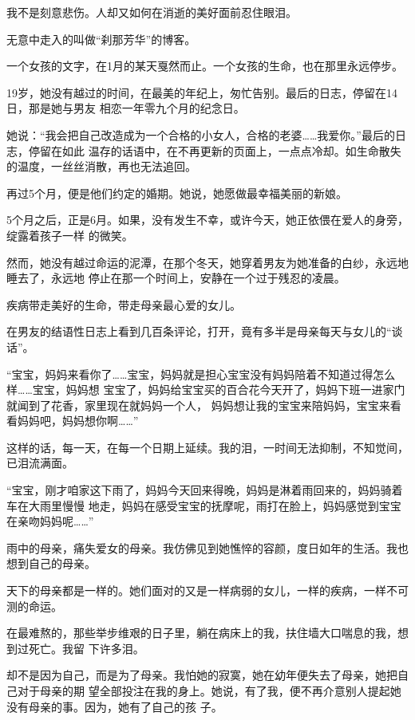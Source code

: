 	\endwriting



		我不是刻意悲伤。人却又如何在消逝的美好面前忍住眼泪。

		无意中走入的叫做“刹那芳华”的博客。

		一个女孩的文字，在1月的某天戛然而止。一个女孩的生命，也在那里永远停步。

		19岁，她没有越过的时间，在最美的年纪上，匆忙告别。最后的日志，停留在14日，那是她与男友
	相恋一年零九个月的纪念日。

		她说：“我会把自己改造成为一个合格的小女人，合格的老婆……我爱你。”最后的日志，停留在如此
	温存的话语中，在不再更新的页面上，一点点冷却。如生命散失的温度，一丝丝消散，再也无法追回。

		再过5个月，便是他们约定的婚期。她说，她愿做最幸福美丽的新娘。

		5个月之后，正是6月。如果，没有发生不幸，或许今天，她正依偎在爱人的身旁，绽露着孩子一样
	的微笑。

		然而，她没有越过命运的泥潭，在那个冬天，她穿着男友为她准备的白纱，永远地睡去了，永远地
	停止在那一个时间上，安静在一个过于残忍的凌晨。

		疾病带走美好的生命，带走母亲最心爱的女儿。

		在男友的结语性日志上看到几百条评论，打开，竟有多半是母亲每天与女儿的“谈话”。

		“宝宝，妈妈来看你了……宝宝，妈妈就是担心宝宝没有妈妈陪着不知道过得怎么样……宝宝，妈妈想
	宝宝了，妈妈给宝宝买的百合花今天开了，妈妈下班一进家门就闻到了花香，家里现在就妈妈一个人，
	妈妈想让我的宝宝来陪妈妈，宝宝来看看妈妈吧，妈妈想你啊……”

		这样的话，每一天，在每一个日期上延续。我的泪，一时间无法抑制，不知觉间，已泪流满面。

		“宝宝，刚才咱家这下雨了，妈妈今天回来得晚，妈妈是淋着雨回来的，妈妈骑着车在大雨里慢慢
	地走，妈妈在感受宝宝的抚摩呢，雨打在脸上，妈妈感觉到宝宝在亲吻妈妈呢……”

		雨中的母亲，痛失爱女的母亲。我仿佛见到她憔悴的容颜，度日如年的生活。我也想到自己的母亲。

		天下的母亲都是一样的。她们面对的又是一样病弱的女儿，一样的疾病，一样不可测的命运。

		在最难熬的，那些举步维艰的日子里，躺在病床上的我，扶住墙大口喘息的我，想到过死亡。我留
	下许多泪。

		却不是因为自己，而是为了母亲。我怕她的寂寞，她在幼年便失去了母亲，她把自己对于母亲的期
	望全部投注在我的身上。她说，有了我，便不再介意别人提起她没有母亲的事。因为，她有了自己的孩
	子。

